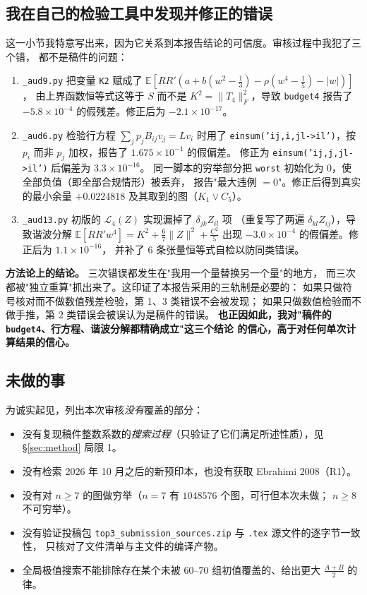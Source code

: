 \documentclass[UTF8,11pt]{ctexart}
\theoremstyle{definition}
\newcommand{\E}{\mathbb{E}}
\begin{document}
\subsection{我在自己的检验工具中发现并修正的错误}

这一小节我特意写出来，因为它关系到本报告结论的可信度。审核过程中我犯了三个错，
都不是稿件的问题：
\begin{enumerate}[leftmargin=1.8em,itemsep=2pt]
\item \texttt{\_aud9.py} 把变量 \texttt{K2} 赋成了 $\E[RR'(a+b(w^2-\frac13)-\rho(w^4-\frac15)-|w|)]$，
由上界函数恒等式这等于 $S$ 而不是 $K^2=\|T_4\|_F^2$，导致 \texttt{budget4} 报告了
$-5.8\times10^{-4}$ 的假残差。修正后为 $-2.1\times10^{-17}$。
\item \texttt{\_aud6.py} 检验行方程 $\sum_jp_jB_{ij}v_j=Lv_i$ 时用了
\texttt{einsum('ij,i,jl->il')}，按 $p_i$ 而非 $p_j$ 加权，报告了 $1.675\times10^{-1}$ 的假偏差。
修正为 \texttt{einsum('ij,j,jl->il')} 后偏差为 $3.3\times10^{-16}$。
同一脚本的穷举部分把 \texttt{worst} 初始化为 $0$，使全部负值（即全部合规情形）被丢弃，
报告"最大违例 $=0$"。修正后得到真实的最小余量 $+0.0224818$ 及其取到的图（$K_1\vee C_5$）。
\item \texttt{\_aud13.py} 初版的 $\mathcal L_4(Z)$ 实现漏掉了 $\delta_{jk}Z_{il}$ 项
（重复写了两遍 $\delta_{kl}Z_{ij}$），导致谐波分解 $\E[RR'w^4]=K^2+\frac67\|Z\|^2+\frac{C^2}5$
出现 $-3.0\times10^{-4}$ 的假偏差。修正后为 $1.1\times10^{-16}$，
并补了 $6$ 条张量恒等式自检以防同类错误。
\end{enumerate}
\noindent\textbf{方法论上的结论。} 三次错误都发生在"我用一个量替换另一个量"的地方，
而三次都被"独立重算"抓出来了。这印证了本报告采用的三轨制是必要的：
如果只做符号核对而不做数值残差检验，第 1、3 类错误不会被发现；
如果只做数值检验而不做手推，第 2 类错误会被误认为是稿件的错误。
\textbf{也正因如此，我对"稿件的 \texttt{budget4}、行方程、谐波分解都精确成立"这三个结论
的信心，高于对任何单次计算结果的信心。}

\subsection{未做的事}

为诚实起见，列出本次审核\emph{没有}覆盖的部分：
\begin{itemize}[leftmargin=1.6em,itemsep=2pt]
\item 没有复现稿件整数系数的\emph{搜索过程}（只验证了它们满足所述性质），见 \S\ref{sec:method} 局限 1。
\item 没有检索 2026 年 10 月之后的新预印本，也没有获取 Ebrahimi 2008（R1）。
\item 没有对 $n\ge7$ 的图做穷举（$n=7$ 有 $1048576$ 个图，可行但本次未做；
$n\ge8$ 不可穷举）。
\item 没有验证投稿包 \texttt{top3\_submission\_sources.zip} 与 \texttt{.tex} 源文件的逐字节一致性，
只核对了文件清单与主文件的编译产物。
\item 全局极值搜索不能排除存在某个未被 $60$--$70$ 组初值覆盖的、给出更大 $\frac{A+B}2$ 的律。
\end{itemize}
\end{document}
